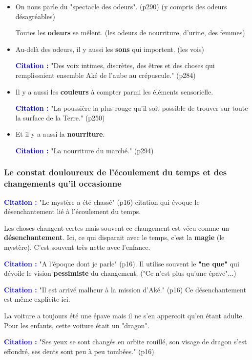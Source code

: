 \documentclass[a4paper, 11pt, hidelinks]{article}
\newcommand{\bs}{\bigskip}
\newcommand{\cit}{\large \textcolor{blue}{\textbf{Citation :}} \large }
\begin{document}
\begin{itemize}
    \item On nous parle du "spectacle des odeurs". (p290) (y compris des odeurs désagréables)

Toutes les \textbf{odeurs} se mêlent. (les odeurs de nourriture, d'urine, des femmes)


    \item Au-delà des odeurs, il y aussi les \textbf{sons} qui importent. (les vois)

\cit "Des voix intimes, discrètes, des êtres et des choses qui remplissaient ensemble Aké de l'aube au crépuscule." (p284)


    \item Il y a aussi les \textbf{couleurs} à compter parmi les éléments sensorielle. 

\cit "La poussière la plus rouge qu'il soit possible de trouver sur toute la surface de la Terre." (p250)


    \item Et il y a aussi la \textbf{nourriture}.
    
\cit "La nourriture du marché." (p294)
\end{itemize}



\subsubsection{Le constat douloureux de l'écoulement du temps et des changements qu'il occasionne}



\cit "Le mystère a été chassé" (p16) citation qui évoque le désenchantement lié à l'écoulement du temps.

Les choses changent certes mais souvent ce changement est vécu comme un \textbf{désenchantement}. Ici, ce qui disparait avec le temps,
c'est la \textbf{magie} (le mystère). C'est souvent très nette avec l'enfance.
\bs

\cit "A l'époque dont je parle" (p16). Il utilise souvent le \textbf{"ne que"} qui dévoile le vision \textbf{pessimiste} du changement. ("Ce n'est plus qu'une épave"...)

\bs
\cit "Il est arrivé malheur à la mission d'Aké." (p16) Ce désenchantement est même explicite ici.

La voiture a toujours été une épave mais il ne s'en appercoit qu'en étant adulte. Pour les enfants, cette voiture
était un "dragon".


\cit "Ses yeux se sont changés en orbite rouillé, son visage de dragon s'est effondré, ses dents sont peu à peu tombées." (p16)
\end{document}
